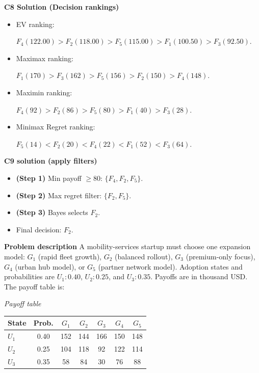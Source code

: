 \begin{ExamProblems}
		\textbf{C8 Solution (Decision rankings)}\par
		\begin{itemize}
			\item EV ranking: \par $F_4(122.00)>F_2(118.00)>F_5(115.00)>F_1(100.50)>F_3(92.50)$.
			\item Maximax ranking:\par $F_1(170)>F_3(162)>F_5(156)>F_2(150)>F_4(148)$.
			\item Maximin ranking: \par $F_4(92)>F_2(86)>F_5(80)>F_1(40)>F_3(28)$.
			\item Minimax Regret ranking:\par $F_5(14)<F_2(20)<F_4(22)<F_1(52)<F_3(64)$.
		\end{itemize}
		
		\textbf{C9 solution (apply filters)}\par
		\begin{itemize}
			\item \textbf{(Step 1)} Min payoff $\geq 80$: $\{F_4,F_2,F_5\}$.
			\item \textbf{(Step 2)} Max regret filter: $\{F_2,F_5\}$.
			\item \textbf{(Step 3)} Bayes selects $F_2$.
			\item Final decision: $F_2$.
		\end{itemize}
		
		\newpage
		\item
		\textbf{Problem description}
		A mobility-services startup must choose one expansion model: $G_1$ (rapid fleet growth), $G_2$ (balanced rollout), $G_3$ (premium-only focus), $G_4$ (urban hub model), or $G_5$ (partner network model).
		Adoption states and probabilities are $U_1:0.40$, $U_2:0.25$, and $U_3:0.35$. Payoffs are in thousand USD. The payoff table is:
		
		\begin{center}
			\textit{Payoff table} \\
			\begin{tabular}{l c c c c c c}
				\hline
				State& Prob. & $G_1$ & $G_2$ & $G_3$ & $G_4$ & $G_5$ \\
				\hline
				$U_1$ & 0.40 & 152 & 144 & 166 & 150 & 148 \\
				$U_2$ & 0.25 & 104 & 118 & 92 & 122 & 114 \\
				$U_3$ & 0.35 & 58 & 84 & 30 & 76 & 88 \\
				\hline
			\end{tabular}
		\end{center}
		

\end{ExamProblems}
